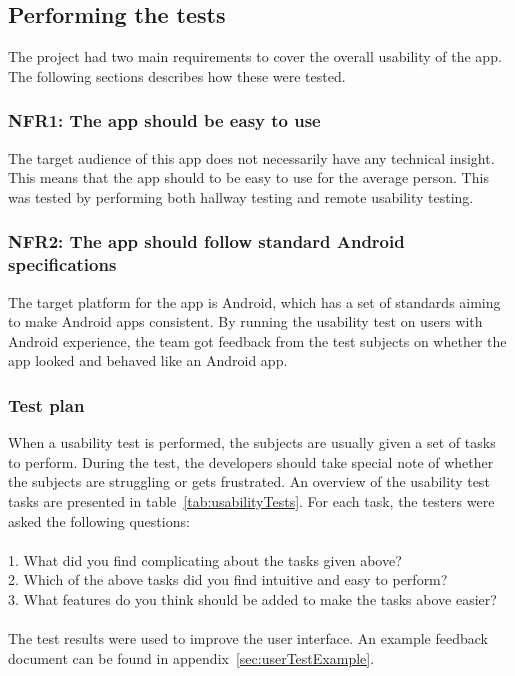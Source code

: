 \subsection{Performing the tests}
The project had two main requirements to cover the overall usability of the app. The following sections describes how these were tested.

\subsubsection{NFR1: The app should be easy to use}
The target audience of this app does not necessarily have any technical insight. This means that the app should to be easy to use for the average person. This was tested by performing both hallway testing and remote usability testing.

\subsubsection{NFR2: The app should follow standard Android specifications}
The target platform for the app is Android, which has a set of standards aiming to make Android apps consistent. By running the usability test on users with Android experience, the team got feedback from the test subjects on whether the app looked and behaved like an Android app.

\subsubsection{Test plan}
When a usability test is performed, the subjects are usually given a set of tasks to perform. During the test, the developers should take special note of whether the subjects are struggling or gets frustrated. An overview of the usability test tasks are presented in table~\ref{tab:usabilityTests}. For each task, the testers were asked the following questions:\\\\
1. What did you find complicating about the tasks given above?\\
2. Which of the above tasks did you find intuitive and easy to perform?\\
3. What features do you think should be added to make the tasks above easier?\\\\
The test results were used to improve the user interface. An example feedback document can be found in appendix~\ref{sec:userTestExample}.

